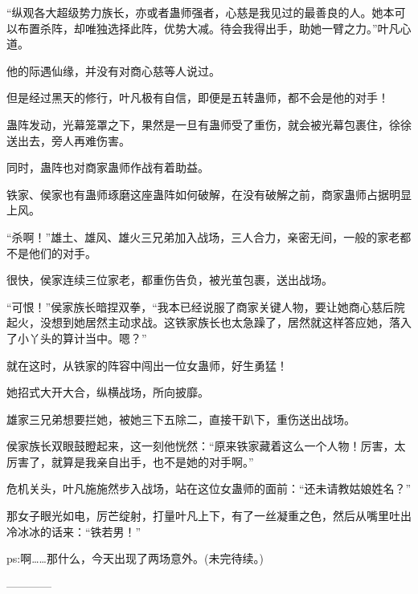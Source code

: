 \begin{this_body}
“纵观各大超级势力族长，亦或者蛊师强者，心慈是我见过的最善良的人。她本可以布置杀阵，却唯独选择此阵，优势大减。待会我得出手，助她一臂之力。”叶凡心道。

他的际遇仙缘，并没有对商心慈等人说过。

但是经过黑天的修行，叶凡极有自信，即便是五转蛊师，都不会是他的对手！

蛊阵发动，光幕笼罩之下，果然是一旦有蛊师受了重伤，就会被光幕包裹住，徐徐送出去，旁人再难伤害。

同时，蛊阵也对商家蛊师作战有着助益。

铁家、侯家也有蛊师琢磨这座蛊阵如何破解，在没有破解之前，商家蛊师占据明显上风。

“杀啊！”雄土、雄风、雄火三兄弟加入战场，三人合力，亲密无间，一般的家老都不是他们的对手。

很快，侯家连续三位家老，都重伤告负，被光茧包裹，送出战场。

“可恨！”侯家族长暗捏双拳，“我本已经说服了商家关键人物，要让她商心慈后院起火，没想到她居然主动求战。这铁家族长也太急躁了，居然就这样答应她，落入了小丫头的算计当中。嗯？”

就在这时，从铁家的阵容中闯出一位女蛊师，好生勇猛！

她招式大开大合，纵横战场，所向披靡。

雄家三兄弟想要拦她，被她三下五除二，直接干趴下，重伤送出战场。

侯家族长双眼鼓瞪起来，这一刻他恍然：“原来铁家藏着这么一个人物！厉害，太厉害了，就算是我亲自出手，也不是她的对手啊。”

危机关头，叶凡施施然步入战场，站在这位女蛊师的面前：“还未请教姑娘姓名？”

那女子眼光如电，厉芒绽射，打量叶凡上下，有了一丝凝重之色，然后从嘴里吐出冷冰冰的话来：“铁若男！”

ps:啊……那什么，今天出现了两场意外。(未完待续。)

------------

\end{this_body}

